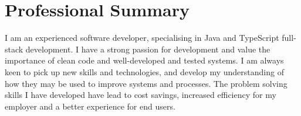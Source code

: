 \section{Professional Summary}

I am an experienced software developer, specialising in Java and TypeScript full-stack development. 
I have a strong passion for development and value the importance of clean code and well-developed and tested systems. 
I am always keen to pick up new skills and technologies, and develop my understanding of how they may be used to improve systems and processes.
The problem solving skills I have developed have lead to cost savings, increased efficiency for my employer and a better experience for end users.